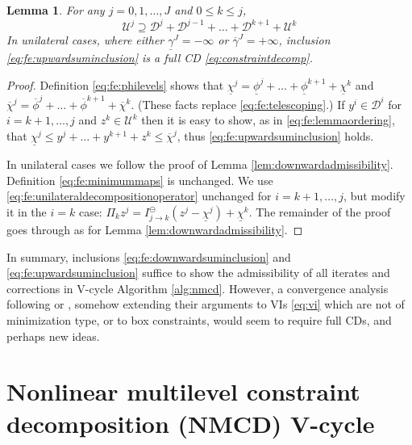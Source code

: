\documentclass[letterpaper,final,12pt,reqno]{amsart}
\theoremstyle{cstyle}
\newtheorem{lemma}[theorem]{Lemma}
\theoremstyle{cstyle*}
\theoremstyle{dstyle}
\numberwithin{equation}{section}
\numberwithin{figure}{section}
\numberwithin{table}{section}
\numberwithin{theorem}{section}
\begin{document}
\begin{lemma}  \label{lem:upwardadmissibility}  For any $j=0,1,\dots,J$ and $0\le k\le j$,
\begin{equation}
\mathcal{U}^j \supseteq \mathcal{D}^j + \mathcal{D}^{j-1} + \dots + \mathcal{D}^{k+1} + \mathcal{U}^k \label{eq:fe:upwardsuminclusion}
\end{equation}
In unilateral cases, where either $\underline{\gamma}^J=-\infty$ or $\overline{\gamma}^J=+\infty$, inclusion \eqref{eq:fe:upwardsuminclusion} is a full CD \eqref{eq:constraintdecomp}. \end{lemma}

\begin{proof}  Definition \eqref{eq:fe:philevels} shows that $\underline{\chi}^j = \underline{\phi}^j + \dots + \underline{\phi}^{k+1} + \underline{\chi}^k$ and $\overline{\chi}^j = \overline{\phi}^j + \dots + \overline{\phi}^{k+1} + \overline{\chi}^k$.  (These facts replace \eqref{eq:fe:telescoping}.)  If $y^i \in \mathcal{D}^i$ for $i=k+1,\dots,j$ and $z^k \in \mathcal{U}^k$ then it is easy to show, as in \eqref{eq:fe:lemmaordering}, that $\underline{\chi}^j \le y^j + \dots + y^{k+1} + z^k \le \overline{\chi}^j$, thus \eqref{eq:fe:upwardsuminclusion} holds.

In unilateral cases we follow the proof of Lemma \ref{lem:downwardadmissibility}.  Definition \eqref{eq:fe:minimummaps} is unchanged.  We use \eqref{eq:fe:unilateraldecompositionoperator} unchanged for $i=k+1,\dots,j$, but modify it in the $i=k$ case: $\Pi_k z^j = I_{j\to k}^\ominus(z^j - \underline{\chi}^j) + \underline{\chi}^k$.  The remainder of the proof goes through as for Lemma \ref{lem:downwardadmissibility}.
\end{proof}

In summary, inclusions \eqref{eq:fe:downwardsuminclusion} and \eqref{eq:fe:upwardsuminclusion} suffice to show the admissibility of all iterates and corrections in V-cycle Algorithm \ref{alg:nmcd}.  However, a convergence analysis following \cite{Tai2003} or \cite{GraeserKornhuber2009}, somehow extending their arguments to VIs \eqref{eq:vi} which are not of minimization type, or to box constraints, would seem to require full CDs, and perhaps new ideas.


\section{Nonlinear multilevel constraint decomposition (NMCD) V-cycle} \label{sec:vcycle}
\end{document}
